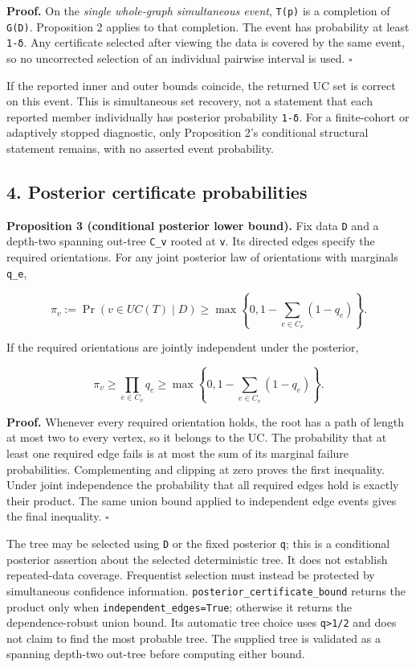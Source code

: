 \documentclass[
  11pt,
]{article}
\begin{document}
\textbf{Proof.} On the \emph{single whole-graph simultaneous event},
\texttt{T(p)} is a completion of \texttt{G(D)}. Proposition 2 applies to
that completion. The event has probability at least \texttt{1-δ}. Any
certificate selected after viewing the data is covered by the same
event, so no uncorrected selection of an individual pairwise interval is
used. \(\square\)

If the reported inner and outer bounds coincide, the returned UC set is
correct on this event. This is simultaneous set recovery, not a
statement that each reported member individually has posterior
probability \texttt{1-δ}. For a finite-cohort or adaptively stopped
diagnostic, only Proposition 2's conditional structural statement
remains, with no asserted event probability.

\hypertarget{posterior-certificate-probabilities}{%
\subsection{4. Posterior certificate
probabilities}\label{posterior-certificate-probabilities}}

\textbf{Proposition 3 (conditional posterior lower bound).} Fix data
\texttt{D} and a depth-two spanning out-tree \texttt{C\_v} rooted at
\texttt{v}. Its directed edges specify the required orientations. For
any joint posterior law of orientations with marginals \texttt{q\_e},

\[
\pi_v:=\Pr(v\in UC(T)\mid D)
\ge \max\!\left\{0,1-\sum_{e\in C_v}(1-q_e)\right\}.
\]

If the required orientations are jointly independent under the
posterior,

\[
\pi_v\ge\prod_{e\in C_v}q_e
\ge\max\!\left\{0,1-\sum_{e\in C_v}(1-q_e)\right\}.
\]

\textbf{Proof.} Whenever every required orientation holds, the root has
a path of length at most two to every vertex, so it belongs to the UC.
The probability that at least one required edge fails is at most the sum
of its marginal failure probabilities. Complementing and clipping at
zero proves the first inequality. Under joint independence the
probability that all required edges hold is exactly their product. The
same union bound applied to independent edge events gives the final
inequality. \(\square\)

The tree may be selected using \texttt{D} or the fixed posterior
\texttt{q}; this is a conditional posterior assertion about the selected
deterministic tree. It does not establish repeated-data coverage.
Frequentist selection must instead be protected by simultaneous
confidence information. \texttt{posterior\_certificate\_bound} returns
the product only when \texttt{independent\_edges=True}; otherwise it
returns the dependence-robust union bound. Its automatic tree choice
uses \texttt{q\textgreater{}1/2} and does not claim to find the most
probable tree. The supplied tree is validated as a spanning depth-two
out-tree before computing either bound.
\end{document}
